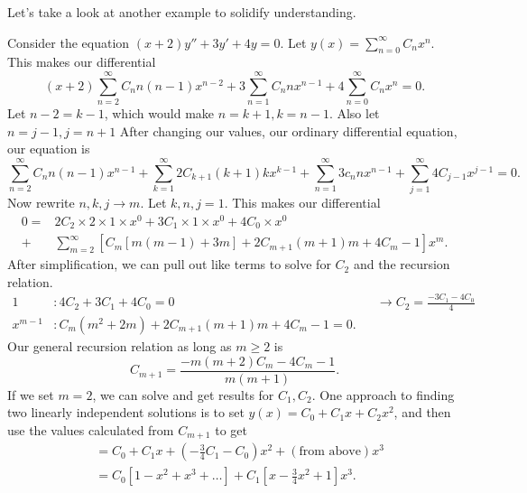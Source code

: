 Let's take a look at another example to solidify understanding.
\begin{eg}
  Consider the equation $(x+2)y''+3y'+4y=0$. Let $y(x)=\sum_{n=0}^{\infty} C_nx^{n}$. This makes our differential 
  \[
    (x+2)\sum_{n=2}^{\infty} C_nn(n-1)x^{n-2}+3 \sum_{n=1}^{\infty} C_nnx^{n-1}+4 \sum_{n=0}^{\infty} C_nx^{n}=0
  .\] 
  Let $n-2=k-1$, which would make $n=k+1,k=n-1$. Also let $n=j-1,j=n+1$ After changing our values, our ordinary differential equation, our equation is 
  \[
    \sum_{n=2}^{\infty} C_nn(n-1)x^{n-1}+\sum_{k=1}^{\infty} 2C_{k+1}(k+1)kx^{k-1}+\sum_{n=1}^{\infty} 3c_nnx^{n-1}+\sum_{j=1}^{\infty} 4C_{j-1}x^{j-1}=0
  .\] 
  Now rewrite $n,k,j\to m$. Let  $k,n,j=1$. This makes our differential 
  \begin{align*}
    0=&2C_2\times 2\times 1\times x^{0}+3C_1\times 1\times x^{0}+4C_0\times x^{0}\\
    +&\sum_{m=2}^{\infty} \left[ C_m\left[ m(m-1)+3m \right] +2C_{m+1}(m+1)m+4C_m-1 \right]x^{m} 
  .\end{align*}
  After simplification, we can pull out like terms to solve for $C_2$ and the recursion relation.
  \begin{align*}
    1&:4C_2+3C_1+4C_0=0&&\to C_2=\frac{-3C_1-4C_0}{4}\\
    x^{m-1}&:C_m(m^2+2m)+2C_{m+1}(m+1)m+4C_m-1 = 0
  .\end{align*}
  Our general recursion relation as long as $m\ge 2$ is 
  \[
    C_{m+1}=\frac{-m(m+2)C_m-4C_m-1}{m(m+1)}
  .\] 
  If we set $m=2$, we can solve and get results for $C_1, C_2$. One approach to finding two linearly independent solutions is to set $y(x)=C_0+C_1x+C_2x^2$, and then use the values calculated from $C_{m+1}$ to get
  \begin{align*}
    &=C_0+C_1x+\left( -\frac{3}{4}C_1-C_0 \right)x^2+(\text{from above})x^3\\
    &=C_0\left[ 1-x^2+\boxed{}x^3+\ldots \right] +C_1\left[ x-\frac{3}{4}x^2+1 \right] x^3
  .\end{align*}
\end{eg}


